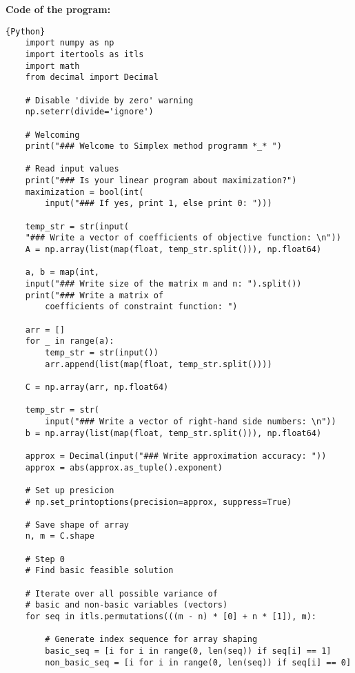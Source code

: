 \documentclass[12pt, legalpaper]{exam}
\begin{document}
\noindent
{}




\vspace{24pt}
\noindent     \textbf{Code of the program:}


\begin{lstlisting}{Python}
    import numpy as np
    import itertools as itls
    import math
    from decimal import Decimal
    
    # Disable 'divide by zero' warning
    np.seterr(divide='ignore')  
    
    # Welcoming
    print("### Welcome to Simplex method programm *_* ")
    
    # Read input values
    print("### Is your linear program about maximization?")
    maximization = bool(int(
        input("### If yes, print 1, else print 0: ")))
    
    temp_str = str(input(
    "### Write a vector of coefficients of objective function: \n"))
    A = np.array(list(map(float, temp_str.split())), np.float64)
    
    a, b = map(int, 
    input("### Write size of the matrix m and n: ").split())
    print("### Write a matrix of 
        coefficients of constraint function: ")
    
    arr = []
    for _ in range(a):
        temp_str = str(input())
        arr.append(list(map(float, temp_str.split())))
    
    C = np.array(arr, np.float64)
    
    temp_str = str(
        input("### Write a vector of right-hand side numbers: \n"))
    b = np.array(list(map(float, temp_str.split())), np.float64)
    
    approx = Decimal(input("### Write approximation accuracy: "))
    approx = abs(approx.as_tuple().exponent)
    
    # Set up presicion
    # np.set_printoptions(precision=approx, suppress=True)
    
    # Save shape of array 
    n, m = C.shape
    
    # Step 0
    # Find basic feasible solution
    
    # Iterate over all possible variance of 
    # basic and non-basic variables (vectors)
    for seq in itls.permutations(((m - n) * [0] + n * [1]), m):
    
        # Generate index sequence for array shaping
        basic_seq = [i for i in range(0, len(seq)) if seq[i] == 1]
        non_basic_seq = [i for i in range(0, len(seq)) if seq[i] == 0]
    

\end{lstlisting}
\end{document}

